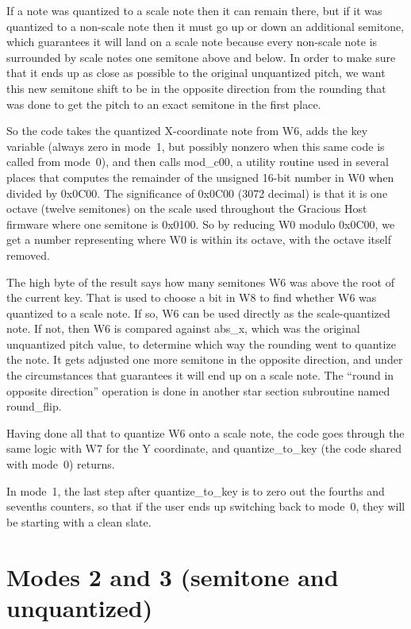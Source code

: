 If a note was quantized to a scale note then it can remain there, but if it
was quantized to a non-scale note then it must go up or down an additional
semitone, which guarantees it will land on a scale note because every
non-scale note is surrounded by scale notes one semitone above and below. 
In order to make sure that it ends up as close as possible to the original
unquantized pitch, we want this new semitone shift to be in the opposite
direction from the rounding that was done to get the pitch to an exact
semitone in the first place.

So the code takes the quantized X-coordinate note from W6, adds the key
variable (always zero in mode~1, but possibly nonzero when this same code is
called from mode~0), and then calls mod\_c00, a utility routine used in
several places that computes the remainder of the unsigned 16-bit number in
W0 when divided by 0x0C00.  The significance of 0x0C00 (3072 decimal) is
that it is one octave (twelve semitones) on the scale used throughout the
Gracious Host firmware where one semitone is 0x0100.  So by reducing W0
modulo 0x0C00, we get a number representing where W0 is within its octave,
with the octave itself removed.

The high byte of the result says how many semitones W6 was above the root of
the current key.  That is used to choose a bit in W8 to find whether W6 was
quantized to a scale note.  If so, W6 can be used directly as the
scale-quantized note.  If not, then W6 is compared against abs\_x, which was
the original unquantized pitch value, to determine which way the rounding
went to quantize the note.  It gets adjusted one more semitone in the
opposite direction, and under the circumstances that guarantees it will end
up on a scale note.  The ``round in opposite direction'' operation is done
in another star section subroutine named round\_flip.

Having done all that to quantize W6 onto a scale note, the code goes through
the same logic with W7 for the Y coordinate, and quantize\_to\_key (the code
shared with mode~0) returns.

In mode~1, the last step after quantize\_to\_key is to zero out the fourths
and sevenths counters, so that if the user ends up switching back to mode~0,
they will be starting with a clean slate.

\section{Modes 2 and 3 (semitone and unquantized)}

